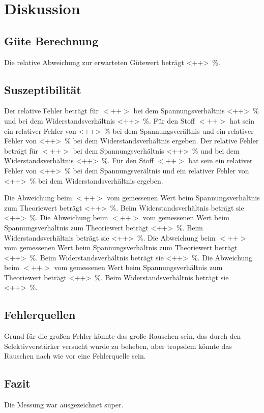 \section{Diskussion}
\label{sec:Diskussion}

\subsection{Güte Berechnung}

Die relative Abweichung zur erwarteten Gütewert beträgt \SI{<++>}{\percent}. 

\subsection{Suszeptibilität}

Der relative Fehler beträgt für $<++>$ bei dem Spannungsverhältnis \SI{<++>}{\percent} und bei dem Widerstandsverhältnis \SI{<++>}{\percent}. Für den Stoff $<++>$ hat sein ein relativer Fehler von \SI{<++>}{\percent} bei dem Spannungsverältnis und ein relativer Fehler von \SI{<++>}{\percent} bei dem Widerstandsverhältnis ergeben.  
Der relative Fehler beträgt für $<++>$ bei dem Spannungsverhältnis \SI{<++>}{\percent} und bei dem Widerstandsverhältnis \SI{<++>}{\percent}. Für den Stoff $<++>$ hat sein ein relativer Fehler von \SI{<++>}{\percent} bei dem Spannungsverältnis und ein relativer Fehler von \SI{<++>}{\percent} bei dem Widerstandsverhältnis ergeben.  

Die Abweichung beim $<++>$ vom gemessenen Wert beim Spannungsverhältnis zum Theoriewert beträgt \SI{<++>}{\percent}. Beim Widerstandsverhältnis beträgt sie \SI{<++>}{\percent}. 
Die Abweichung beim $<++>$ vom gemessenen Wert beim Spannungsverhältnis zum Theoriewert beträgt \SI{<++>}{\percent}. Beim Widerstandsverhältnis beträgt sie \SI{<++>}{\percent}. 
Die Abweichung beim $<++>$ vom gemessenen Wert beim Spannungsverhältnis zum Theoriewert beträgt \SI{<++>}{\percent}. Beim Widerstandsverhältnis beträgt sie \SI{<++>}{\percent}. 
Die Abweichung beim $<++>$ vom gemessenen Wert beim Spannungsverhältnis zum Theoriewert beträgt \SI{<++>}{\percent}. Beim Widerstandsverhältnis beträgt sie \SI{<++>}{\percent}. 

\subsection{Fehlerquellen}

Grund für die großen Fehler könnte das große Rauschen sein, das durch den Selektivverstärker versucht wurde zu beheben, aber tropsdem könnte das Rauschen nach wie vor eine Fehlerquelle sein. 

\subsection{Fazit}
Die Messung war ausgezeichnet super.
